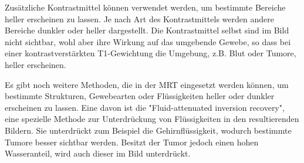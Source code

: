 Zusätzliche Kontrastmittel können verwendet werden, um bestimmte Bereiche heller erscheinen zu lassen. Je nach Art des Kontrastmittels werden andere Bereiche dunkler oder heller dargestellt. Die Kontrastmittel selbst sind im Bild nicht sichtbar, wohl aber ihre Wirkung auf das umgebende Gewebe, so dass bei einer kontrastverstärkten T1-Gewichtung die Umgebung, z.B. Blut oder Tumore, heller erscheinen. \cite[vgl.][]{ChristophPabst2013}

Es gibt noch weitere Methoden, die in der \ac{MRT} eingesetzt werden können, um bestimmte Strukturen, Gewebearten oder Flüssigkeiten heller oder dunkler erscheinen zu lassen. Eine davon ist die "Fluid-attenuated inversion recovery", eine spezielle Methode zur Unterdrückung von Flüssigkeiten in den resultierenden Bildern. Sie unterdrückt zum Beispiel die Gehirnflüssigkeit, wodurch bestimmte Tumore besser sichtbar werden. Besitzt der Tumor jedoch einen hohen Wasseranteil, wird auch dieser im Bild unterdrückt. \cite[vgl.][]{Gizewski2001}